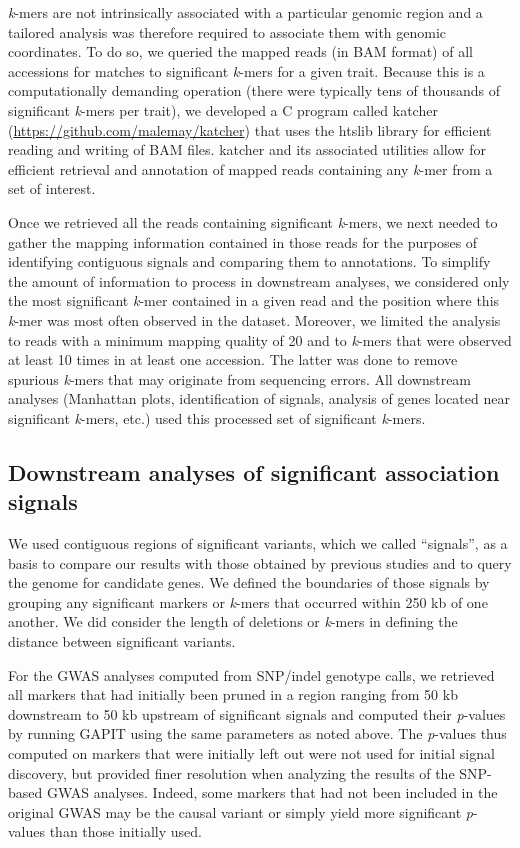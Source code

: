 \documentclass{article}
\begin{document}
\emph{k}-mers are not intrinsically associated with a particular genomic region
and a tailored analysis was therefore required to associate them with genomic
coordinates. To do so, we queried the mapped reads (in BAM format) of all accessions for matches
to significant \emph{k}-mers for a given trait. Because this is a
computationally demanding operation (there were typically tens of thousands of
significant \emph{k}-mers per trait), we developed a C program called katcher
(\url{https://github.com/malemay/katcher}) that
uses the htslib library  for efficient reading and
writing of BAM files. katcher and its associated utilities allow for efficient
retrieval and annotation of mapped reads containing any \emph{k}-mer from a set
of interest.

Once we retrieved all the reads containing significant \emph{k}-mers, we next
needed to gather the mapping information contained in those reads for the
purposes of identifying contiguous signals and comparing them to annotations. To
simplify the amount of information to process in downstream analyses, we
considered only the most significant \emph{k}-mer contained in a given read and
the position where this \emph{k}-mer was most often observed in
the dataset. Moreover, we limited the analysis to reads with a minimum mapping
quality of 20 and to \emph{k}-mers that were observed at least 10 times in at
least one accession. The latter was done to remove spurious \emph{k}-mers that may originate
from sequencing errors. All downstream analyses (Manhattan plots,
identification of signals, analysis of genes located near significant
\emph{k}-mers, etc.) used this processed set of significant \emph{k}-mers.

\subsection*{Downstream analyses of significant association signals}

We used contiguous regions of significant variants, which we called
``signals'', as a basis to compare our results with those obtained by previous
studies and to query the genome for candidate genes. We defined the boundaries
of those signals by grouping any significant markers or \emph{k}-mers that
occurred within 250 kb of one another.  We did consider the length of deletions
or \emph{k}-mers in defining the distance between significant variants.

For the GWAS analyses computed from SNP/indel genotype calls, we retrieved all
markers that had initially been pruned in a region ranging from 50 kb
downstream to 50 kb upstream of significant signals and computed their
\emph{p}-values by running GAPIT using the same parameters as noted above. The
\emph{p}-values thus computed on markers that were initially left out were not
used for initial signal discovery, but provided finer resolution when analyzing
the results of the SNP-based GWAS analyses. Indeed, some markers that had not
been included in the original GWAS may be the causal variant or simply yield
more significant \emph{p}-values than those initially used.
\end{document}
